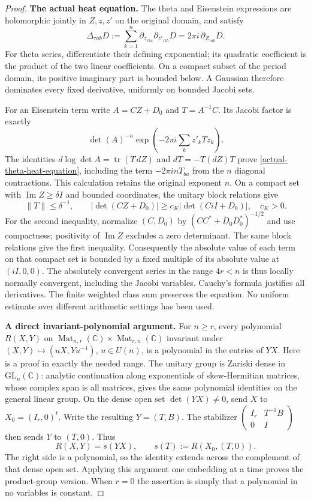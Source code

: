 \begin{proof}
\textbf{The actual heat equation.}
The theta and Eisenstein expressions are holomorphic jointly in
$Z,z,z'$ on the original domain, and satisfy
\begin{equation}\label{actual-theta-heat-equation}
 \Delta_{\tau ab}D:=
 \sum_{k=1}^{n}\partial_{z_{\tau ka}}\partial_{z'_{\tau kb}}D
       =2\pi i\,\partial_{Z_{\tau ab}}D.
\end{equation}
For theta series, differentiate their defining exponential; its
quadratic coefficient is the product of the two linear coefficients.
On a compact subset of the period domain, its positive imaginary
part is bounded below. A Gaussian therefore dominates every fixed
derivative, uniformly on bounded Jacobi sets.

For an Eisenstein term write $A=CZ+D_0$ and $T=A^{-1}C$.
Its Jacobi factor is exactly
\[
 \det(A)^{-n}
 \exp\!\left(-2\pi i\sum_k z'_kTz_k\right).
\]
The identities $d\log\det A=\operatorname{tr}(T\,dZ)$ and
$dT=-T(dZ)T$ prove \eqref{actual-theta-heat-equation}, including
the term $-2\pi i nT_{ba}$ from the $n$ diagonal contractions.
This calculation retains the original exponent $n$.
On a compact set with $\operatorname{Im}Z\ge\delta I$ and bounded
coordinates, the unitary block relations give
\[
 \|T\|\le\delta^{-1},\qquad
 |\det(CZ+D_0)|\ge c_K|\det(CiI+D_0)|,
 \quad c_K>0.
\]
For the second inequality, normalize $(C,D_0)$ by
$(CC^*+D_0D_0^*)^{-1/2}$ and use compactness; positivity of
$\operatorname{Im}Z$ excludes a zero determinant. The same block
relations give the first inequality. Consequently the absolute
value of each term on that compact set is bounded by a fixed
multiple of its absolute value at $(iI,0,0)$. The absolutely
convergent series in the range $4r<n$ is thus locally normally
convergent, including the Jacobi variables. Cauchy's formula
justifies all derivatives. The finite weighted class sum preserves
the equation. No uniform estimate over different arithmetic settings
has been used.

\textbf{A direct invariant-polynomial argument.}
For $n\ge r$, every polynomial $R(X,Y)$ on
$\operatorname{Mat}_{n,r}(\mathbb C)\times
\operatorname{Mat}_{r,n}(\mathbb C)$ invariant under
$(X,Y)\mapsto(uX,Yu^{-1})$, $u\in U(n)$, is a polynomial in the
entries of $YX$. Here is a proof in exactly the needed range.
The unitary group is Zariski dense in $\mathrm{GL}_n(\mathbb C)$:
analytic continuation along exponentials of skew-Hermitian matrices,
whose complex span is all matrices, gives the same polynomial
identities on the general linear group. On the dense open set
$\det(YX)\ne0$, send $X$ to $X_0=(I_r,0)^t$. Write the resulting
$Y=(T,B)$. The stabilizer
$\left(\begin{smallmatrix}I_r&T^{-1}B\\0&I\end{smallmatrix}\right)$
then sends $Y$ to $(T,0)$. Thus
\[
 R(X,Y)=s(YX),\qquad s(T):=R(X_0,(T,0)).
\]
The right side is a polynomial, so the identity extends across the
complement of that dense open set. Applying this argument one
embedding at a time proves the product-group version. When $r=0$
the assertion is simply that a polynomial in no variables is constant.


\end{proof}
